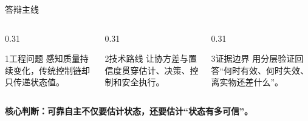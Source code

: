 \begin{frame}
  \maketitle
\end{frame}

\begin{frame}{答辩主线}
  \begin{columns}[T,onlytextwidth]
    \begin{column}{0.31\textwidth}
      \begin{block}{1\quad 工程问题}
        感知质量持续变化，传统控制链却只传递状态值。
      \end{block}
    \end{column}
    \begin{column}{0.31\textwidth}
      \begin{block}{2\quad 技术路线}
        让协方差与置信度贯穿估计、决策、控制和安全执行。
      \end{block}
    \end{column}
    \begin{column}{0.31\textwidth}
      \begin{block}{3\quad 证据边界}
        用分层验证回答“何时有效、何时失效、离实物还差什么”。
      \end{block}
    \end{column}
  \end{columns}

  \vfill
  \centering
  {\Large\bfseries 核心判断：可靠自主不仅要估计状态，还要估计“状态有多可信”。}
\end{frame}
